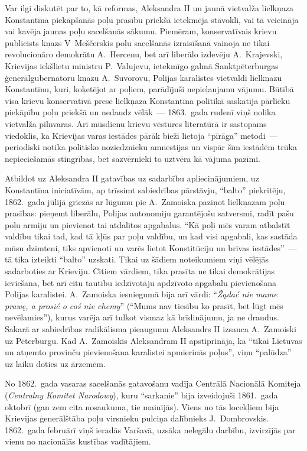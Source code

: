\documentclass[twoside,a5paper,12pt,fleqn,openany]{extbook}
\newcommand{\pltxti}[1]{\textit{\textpolish{#1}}}
\begin{document}
Var ilgi diskutēt par to, kā reformas, Aleksandra II un jaunā vietvalža lielkņaza Konstantīna piekāpšanās poļu prasību priekšā ietekmēja stāvokli, vai tā veicināja vai kavēja jaunas poļu sacelšanās sākumu. Piemēram, konservatīvais krievu publicists kņazs V~Meščerskis poļu sacelšanās izraisīšanā vainoja ne tikai revolucionāro demokrātu A.~Hercenu, bet arī liberālo izdevēju A.~Krajevski, Krievijas iekšlietu ministru P.~Valujevu, ietekmīgo galmā Sanktpēterburgas ģenerālgubernatoru kņazu A.~Suvorovu, Polijas karalistes vietvaldi lielkņazu Konstantīnu, kuri, koķetējot ar poļiem, parādījuši nepieļaujamu vājumu. Būtībā visa krievu konservatīvā prese lielkņaza Konstantīna politikā saskatīja pārlieku piekāpību poļu priekšā un nedaudz vēlāk~--- 1863.~gada rudenī viņš nolika vietvalža pilnvaras. Arī mūsdienu krievu vēstures literatūrā ir sastopams viedoklis, ka Krievijas varas iestādes pārāk bieži lietoja ``pīrāga'' metodi~--- periodiski notika politisko noziedznieku amnestijas un vispār šīm iestādēm trūka nepieciešamās stingrības, bet sazvērnieki to uztvēra kā vājuma pazīmi.

Atbildot uz Aleksandra II gatavības uz sadarbību apliecinājumiem, uz Konstantīna iniciatīvām, ap trīssimt sabiedrības pārstāvju, ``balto'' piekritēju, 1862.~gada jūlijā griezās ar lūgumu pie A.~Zamoiska paziņot lielkņazam poļu prasības: pieņemt liberālu, Polijas autonomiju garantējošu satversmi, radīt pašu poļu armiju un pievienot tai atdalītos apgabalus. ``Kā poļi mēs varam atbalstīt valdību tikai tad, kad tā kļūs par poļu valdību, un kad visi apgabali, kas sastāda mūsu dzimteni, tiks apvienoti un varēs lietot Konstitūciju un brīvas iestādes''~--- tā tika izteikti ``balto'' uzskati. Tikai uz šādiem noteikumiem viņi vēlējās sadarboties ar Krieviju. Citiem vārdiem, tika prasīta ne tikai demokrātijas ieviešana, bet arī citu tautību iedzīvotāju apdzīvoto apgabalu pievienošana Polijas karalistei. A.~Zamoiska iesniegumā bija arī vārdi: ``\pltxti{Žądać nie mame prawę, a prosić o coś nie chemy}'' (``Mums nav tiesību ko prasīt, bet lūgt mēs nevēlamies''), kurus varēja arī tulkot vismaz kā brīdinājumu, ja ne draudus. Sakarā ar sabiedrības radikālisma pieaugumu Aleksandrs II izsauca A.~Zamoiski uz Pēterburgu. Kad A.~Zamoiskis Aleksandram II apstiprināja, ka ``tikai Lietuvas un atņemto provinču pievienošana karalistei apmierinās poļus'', viņu ``palūdza'' uz laiku doties uz ārzemēm.

No 1862.~gada vasaras sacelšanās gatavošanu vadīja Centrālā Nacionālā Komiteja (\pltxti{Centralny Komitet Narodowy}), kuru ``sarkanie'' bija izveidojuši 1861.~gada oktobrī (gan zem cita nosaukuma, tie mainījās). Viens no tās locekļiem bija Krievijas ģenerālštāba poļu virsnieku pulciņa dalībnieks J.~Dombrovskis. 1862.~gada februārī viņš ieradās Varšavā, uzsāka nelegālu darbību, izvirzījās par vienu no nacionālās kustības vadītājiem.
\end{document}
